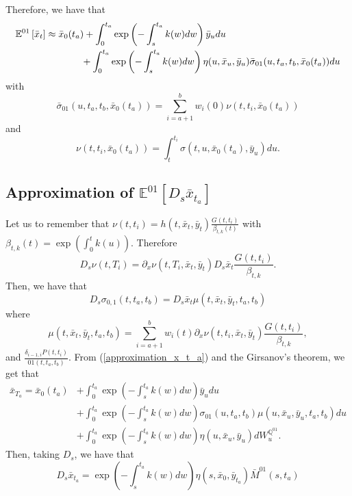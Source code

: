 \documentclass[a4paper,10pt]{article}
\newcommand{\1}{\mathbf{1}}
\begin{document}
Therefore, we have that
\begin{align}
\mathbb{E}^{01}\left[\bar{x}_t\right] &\approx \bar{x}_0(t_a)  + \int_{0}^{t_a} \exp\left(-\int_{s}^{t_a}k(w) dw\right) \bar{y}_u du \nonumber \\ 
&\hspace{1.3cm} + \int_{0}^{t_a} \exp\left(-\int_{s}^{t_a}k(w) dw\right) \eta(u,\bar{x}_u,\bar{y}_u) \bar{\sigma}_{01}(u, t_a, t_b,\bar{x}_0(t_a)) du
\end{align}
with
$$
\bar{\sigma}_{01}(u, t_a, t_b,\bar{x}_0(t_a)) = \sum_{i=a+1}^{b} w_i(0) \nu(t,t_i,\bar{x}_0(t_a))
$$
and
$$
\nu(t,t_i,\bar{x}_0(t_a)) = \int_{t}^{t_i} \sigma(t,u,\bar{x}_0(t_a),\bar{y}_u) du.
$$ 

\subsection{Approximation of $\mathbb{E}^{01}\left[D_s \bar{x}_{t_a} \right]$}\label{approximation_under_annuity_measeure_d_s}
Let us to remember that $\nu(t,t_i)=h(t,\bar{x}_t,\bar{y}_t) \frac{G(t,t_i)}{\beta_{t,k}(t)}$ with  $\beta_{t,k}(t) = \exp\left(\int_{0}^{t}k(u)\right)$.
Therefore 
\begin{equation*}
D_s \nu(t,T_i) = \partial_x \nu(t,T_i, \bar{x}_t, \bar{y}_t) D_s \bar{x}_t  \frac{G(t,t_i)}{\beta_{t,k}}.
\end{equation*}
Then, we have that
\begin{equation}
D_s \sigma_{0,1}(t,t_a,t_b) =  D_s \bar{x}_t \mu(t,\bar{x}_t, \bar{y}_t, t_a,t_b)
\end{equation}
where 
$$
\mu(t,\bar{x}_t, \bar{y}_t, t_a,t_b) =  \sum_{i=a+1}^{b} w_i(t) \partial_x \nu(t,t_i, \bar{x}_t, \bar{y}_t) \frac{G(t,t_i)}{\beta_{t,k}},
$$
and $\frac{\delta_{i-1,i} P(t,t_i)}{01(t,t_a,t_b)}$. From (\ref{approximation_x_t_a})  and the Girsanov's theorem, we get that
\begin{align*}
\bar{x}_{T_a} =  \bar{x}_0(t_a)  &+ \int_{0}^{t_a} \exp\left(-\int_{s}^{t_a}k(w) dw\right) \bar{y}_u du \nonumber \\\ 
&+ \int_{0}^{t_a} \exp\left(-\int_{s}^{t_a}k(w) dw\right) \sigma_{01}(u,t_a,t_b) \mu(u,\bar{x}_u, \bar{y}_u, t_a,t_b) du \nonumber \\\
&+  \int_{0}^{t_a}  \exp\left(-\int_{s}^{t_a}k(w) dw \right) \eta(u,\bar{x}_u,\bar{y}_u) dW_u^{\mathbb{Q}^{01}}.
\end{align*}
Then, taking $D_s$, we have that
\begin{equation*}
D_s \bar{x}_{t_a} = \exp\left(-\int_{s}^{t_a}k(w) dw \right) \eta(s,\bar{x}_0,\bar{y}_{t_a})\bar{M}^{01}(s,t_a)
\end{equation*}
\end{document}
